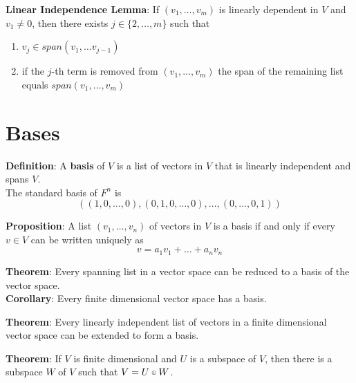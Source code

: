 \documentclass[a4paper, 10pt]{report}
\newcommand\smallmath[2]{#1{\raisebox{\dimexpr \fontdimen 22 \textfont 2
      - \fontdimen 22 \scriptscriptfont 2 \relax}{$\scriptscriptstyle #2$}}}
\newcommand\smalloplus{\smallmath\mathbin\oplus}
\begin{document}
\begin{framed}
   \textbf{Linear Independence Lemma}: If $(v_1, \hdots, v_m)$ is linearly dependent in $V$ and $v_1 \neq 0$, then there exists $j \in \{ 2, \hdots, m \} $ such that 
   \begin{enumerate}
      \item $v_j \in span(v_1, \hdots v_{j-1})$ 
      \item if the $j$-th term is removed from $(v_1, \hdots, v_m)$ the span of the remaining list equals $span(v_1, \hdots, v_m)$
     
   \end{enumerate}
\end{framed}

\section{Bases}
\begin{framed}
   \textbf{Definition}: A \textbf{basis} of $V$ is a list of vectors in $V$ that is linearly independent and spans $V$. \\

   The standard basis of $F^n$ is \[
      ((1, 0, \hdots, 0), (0, 1, 0, \hdots, 0), \hdots, (0, \hdots, 0, 1))
   \] 
\end{framed}

\begin{framed}
   \textbf{Proposition}: A list $(v_1, \hdots, v_n)$ of vectors in $V$ is a basis if and only if every $v \in V$ can be written uniquely as 
   \[
     v = a_1 v_1 + \hdots + a_n v_n
   \] 
\end{framed}

\begin{framed}
   \textbf{Theorem}: Every spanning list in a vector space can be reduced to a basis of the vector space.  \\

   \textbf{Corollary}: Every finite dimensional vector space has a basis.
\end{framed}

\begin{framed}
   \textbf{Theorem}: Every linearly independent list of vectors in a finite dimensional vector space can be extended to form a basis. 
\end{framed}

\begin{framed}
   \textbf{Theorem}: If $V$ is finite dimensional and $U$ is a subspace of $V$, then there is a  subspace $W$ of $V$ such that $V = U \smalloplus W$.
\end{framed}
\end{document}
